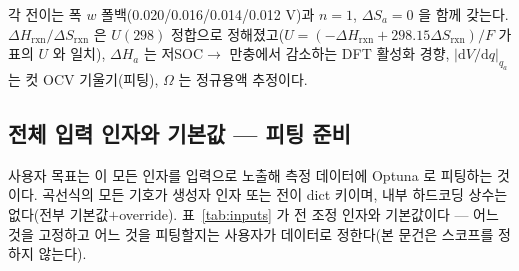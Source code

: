 \documentclass[11pt,a4paper]{article}
\newcommand{\dd}{\mathrm{d}}
\newcommand{\rxn}{\mathrm{rxn}}
\begin{document}
각 전이는 폭 $w$ 폴백(0.020/0.016/0.014/0.012 V)과 $n=1$, $\Delta S_a=0$ 을 함께 갖는다. $\Delta H_\rxn/\Delta S_\rxn$
은 $U(298)$ 정합으로 정해졌고($U=(-\Delta H_\rxn+298.15\Delta S_\rxn)/F$ 가 표의 $U$ 와 일치), $\Delta H_a$ 는 저SOC$\to$
만충에서 감소하는 DFT 활성화 경향, $|\dd V/\dd q|_{q_a}$ 는 컷 OCV 기울기(피팅), $\Omega$ 는 정규용액 추정이다.

\subsection{전체 입력 인자와 기본값 — 피팅 준비}
사용자 목표는 이 모든 인자를 입력으로 노출해 측정 데이터에 Optuna 로 피팅하는 것이다. 곡선식의 모든 기호가 생성자 인자
또는 전이 dict 키이며, 내부 하드코딩 상수는 없다(전부 기본값$+$override). 표~\ref{tab:inputs} 가 전 조정 인자와
기본값이다 — 어느 것을 고정하고 어느 것을 피팅할지는 사용자가 데이터로 정한다(본 문건은 스코프를 정하지 않는다).
\end{document}
